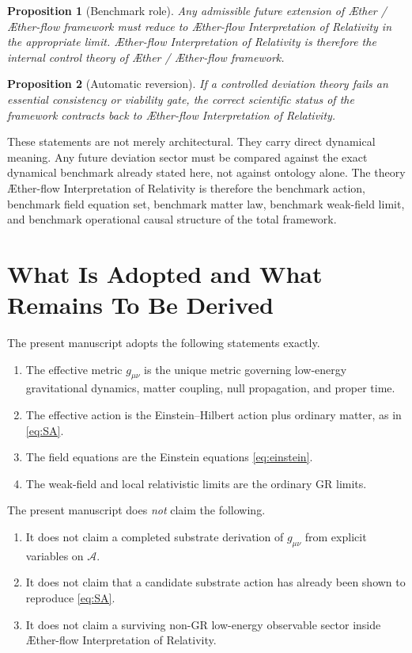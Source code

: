 \documentclass[11pt]{article}
\newcommand{\Aether}{\AE{}ther}
\newcommand{\Aflow}{\AE{}ther-flow}
\newcommand{\TheoryName}{\Aflow{} Interpretation of Relativity}
\newcommand{\TheoryProgram}{\Aether{} / \Aflow{} framework}
\newcommand{\Sub}{\mathcal{A}}
\newtheorem{proposition}{Proposition}
\begin{document}
\begin{proposition}[Benchmark role]
Any admissible future extension of \TheoryProgram{} must reduce to \TheoryName{} in the appropriate limit. \TheoryName{} is therefore the internal control theory of \TheoryProgram{}.
\end{proposition}

\begin{proposition}[Automatic reversion]
If a controlled deviation theory fails an essential consistency or viability gate, the correct scientific status of the framework contracts back to \TheoryName{}.
\end{proposition}

These statements are not merely architectural. They carry direct dynamical meaning. Any future deviation sector must be compared against the exact dynamical benchmark already stated here, not against ontology alone. The theory \TheoryName{} is therefore the benchmark action, benchmark field equation set, benchmark matter law, benchmark weak-field limit, and benchmark operational causal structure of the total framework.

\section{What Is Adopted and What Remains To Be Derived}

The present manuscript adopts the following statements exactly.
\begin{enumerate}
    \item The effective metric \(g_{\mu\nu}\) is the unique metric governing low-energy gravitational dynamics, matter coupling, null propagation, and proper time.
    \item The effective action is the Einstein--Hilbert action plus ordinary matter, as in \eqref{eq:SA}.
    \item The field equations are the Einstein equations \eqref{eq:einstein}.
    \item The weak-field and local relativistic limits are the ordinary GR limits.
\end{enumerate}

The present manuscript does \emph{not} claim the following.
\begin{enumerate}
    \item It does not claim a completed substrate derivation of \(g_{\mu\nu}\) from explicit variables on \(\Sub\).
    \item It does not claim that a candidate substrate action has already been shown to reproduce \eqref{eq:SA}.
    \item It does not claim a surviving non-GR low-energy observable sector inside \TheoryName{}.
\end{enumerate}
\end{document}
